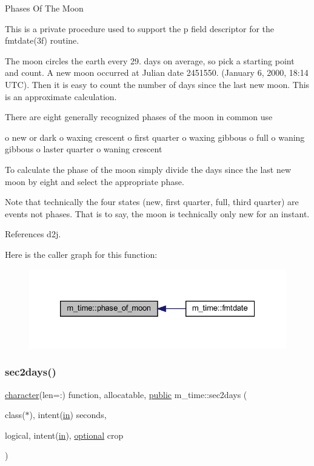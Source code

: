 \begin{DoxyVerb}
Phases Of The Moon

This is a private procedure used to support the p field descriptor for the fmtdate(3f) routine.

The moon circles the earth every 29. days on average, so pick a starting point and count. A new moon occurred at Julian date 2451550. (January 6, 2000, 18\+:14 U\+TC). Then it is easy to count the number of days since the last new moon. This is an approximate calculation.

There are eight generally recognized phases of the moon in common use

o new or dark o waxing crescent o first quarter o waxing gibbous o full o waning gibbous o laster quarter o waning crescent

To calculate the phase of the moon simply divide the days since the last new moon by eight and select the appropriate phase.

Note that technically the four states (new, first quarter, full, third quarter) are events not phases. That is to say, the moon is technically only new for an instant. 

References d2j.

Here is the caller graph for this function\+:
\nopagebreak
\begin{figure}[H]
\begin{center}
\leavevmode
\includegraphics[width=326pt]{namespacem__time_ab8a976e2f113cc38b6df80974cee55dc_icgraph}
\end{center}
\end{figure}
\mbox{\label{namespacem__time_a7788285d79b8d58323b05e9a30a2d992}} 
\subsubsection{\texorpdfstring{sec2days()}{sec2days()}}
{\footnotesize\ttfamily \hyperlink{option__stopwatch_83_8txt_abd4b21fbbd175834027b5224bfe97e66}{character}(len=\+:) function, allocatable, \hyperlink{M__stopwatch_83_8txt_a2f74811300c361e53b430611a7d1769f}{public} m\+\_\+time\+::sec2days (\begin{DoxyParamCaption}\item[{class($\ast$), intent(\hyperlink{M__journal_83_8txt_afce72651d1eed785a2132bee863b2f38}{in})}]{seconds,  }\item[{logical, intent(\hyperlink{M__journal_83_8txt_afce72651d1eed785a2132bee863b2f38}{in}), \hyperlink{option__stopwatch_83_8txt_aa4ece75e7acf58a4843f70fe18c3ade5}{optional}}]{crop }\end{DoxyParamCaption})}




\end{DoxyVerb}
